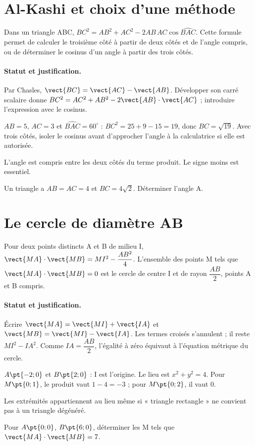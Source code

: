 \section{Al-Kashi et choix d’une méthode}\label{C03-U4}
\begin{keypoint}
Dans un triangle ABC, $BC^2=AB^2+AC^2-2AB\,AC\cos\widehat{BAC}$. Cette formule permet de calculer le troisième côté à partir de deux côtés et de l’angle compris, ou de déterminer le cosinus d’un angle à partir des trois côtés.
\end{keypoint}
\paragraph{Statut et justification.} Par Chasles, $\vect{BC}=\vect{AC}-\vect{AB}$. Développer son carré scalaire donne $BC^2=AC^2+AB^2-2\vect{AB}\cdot\vect{AC}$ ; introduire l’expression avec le cosinus.
\begin{example}$AB=5$, $AC=3$ et $\widehat{BAC}=60^\circ$ : $BC^2=25+9-15=19$, donc $BC=\sqrt{19}$. Avec trois côtés, isoler le cosinus avant d’approcher l’angle à la calculatrice si elle est autorisée.\end{example}\label{C03-EX4}
\begin{pitfall}L’angle est compris entre les deux côtés du terme produit. Le signe moins est essentiel.\end{pitfall}
\begin{application}Un triangle a $AB=AC=4$ et $BC=4\sqrt2$. Déterminer l’angle A.\end{application}\label{C03-AP4}
\section{Le cercle de diamètre AB}\label{C03-U5}
\begin{keypoint}
Pour deux points distincts A et B de milieu I, $\vect {MA}\cdot \vect {MB}=MI^2-\dfrac{AB^2}{4}$. L’ensemble des points M tels que $\vect{MA}\cdot\vect{MB}=0$ est le cercle de centre I et de rayon $\dfrac{AB}{2}$, points A et B compris.
\end{keypoint}
\paragraph{Statut et justification.} Écrire $\vect{MA}=\vect{MI}+\vect{IA}$ et $\vect{MB}=\vect{MI}-\vect{IA}$. Les termes croisés s’annulent ; il reste $MI^2-IA^2$. Comme $IA=\dfrac{AB}{2}$, l’égalité à zéro équivaut à l’équation métrique du cercle.
\begin{example}$A\pt{-2;0}$ et $B\pt{2;0}$ : I est l’origine. Le lieu est $x^2+y^2=4$. Pour $M\pt{0;1}$, le produit vaut $1-4=-3$ ; pour $M\pt{0;2}$, il vaut 0.\end{example}\label{C03-EX5}
\begin{pitfall}Les extrémités appartiennent au lieu même si « triangle rectangle » ne convient pas à un triangle dégénéré.\end{pitfall}
\begin{application}Pour $A\pt{0;0}$, $B\pt{6;0}$, déterminer les M tels que $\vect{MA}\cdot\vect{MB}=7$.\end{application}\label{C03-AP5}
\mxnewpage
